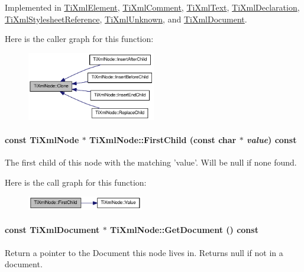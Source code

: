 Implemented in \hyperlink{class_ti_xml_element_a13f6df105ebb1e8dc636e75cc883be32}{TiXmlElement}, \hyperlink{class_ti_xml_comment_a4f6590c9c9a2b63a48972655b78eb853}{TiXmlComment}, \hyperlink{class_ti_xml_text_adde1869dfb029be50713fbfd8ce4d21f}{TiXmlText}, \hyperlink{class_ti_xml_declaration_aff8231266d735943d8a7514a9c9822b9}{TiXmlDeclaration}, \hyperlink{class_ti_xml_stylesheet_reference_a4e3ceb9a5650537c7fda02997edb5ec4}{TiXmlStylesheetReference}, \hyperlink{class_ti_xml_unknown_a675c4b2684af35e4c7649b7fd5ae598d}{TiXmlUnknown}, and \hyperlink{class_ti_xml_document_ac9e8f09b23454d953b32d1b65cd1409e}{TiXmlDocument}.

Here is the caller graph for this function:\nopagebreak
\begin{figure}[H]
\begin{center}
\leavevmode
\includegraphics[width=159pt]{class_ti_xml_node_a4508cc3a2d7a98e96a54cc09c37a78a4_icgraph}
\end{center}
\end{figure}
\hypertarget{class_ti_xml_node_ab5f722624113c8203227de4f56576d31}{
\paragraph[{FirstChild}]{\setlength{\rightskip}{0pt plus 5cm}const {\bf TiXmlNode} $\ast$ TiXmlNode::FirstChild (const char $\ast$ {\em value}) const}\hfill}
\label{class_ti_xml_node_ab5f722624113c8203227de4f56576d31}
The first child of this node with the matching 'value'. Will be null if none found. 

Here is the call graph for this function:\nopagebreak
\begin{figure}[H]
\begin{center}
\leavevmode
\includegraphics[width=143pt]{class_ti_xml_node_ab5f722624113c8203227de4f56576d31_cgraph}
\end{center}
\end{figure}
\hypertarget{class_ti_xml_node_aa66f4ebcd175204a168ed7c2d7b43071}{
\paragraph[{GetDocument}]{\setlength{\rightskip}{0pt plus 5cm}const {\bf TiXmlDocument} $\ast$ TiXmlNode::GetDocument () const}\hfill}
\label{class_ti_xml_node_aa66f4ebcd175204a168ed7c2d7b43071}
Return a pointer to the Document this node lives in. Returns null if not in a document. 

